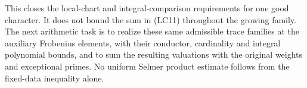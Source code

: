 This closes the local-chart and integral-comparison requirements for
one good character.  It does not bound the sum in (LC11) throughout
the growing family.  The next arithmetic task is to realize these
same admissible trace families at the auxiliary Frobenius elements,
with their conductor, cardinality and integral polynomial bounds,
and to sum the resulting valuations with the original weights and
exceptional primes.  No uniform Selmer product estimate follows
from the fixed-data inequality alone.

